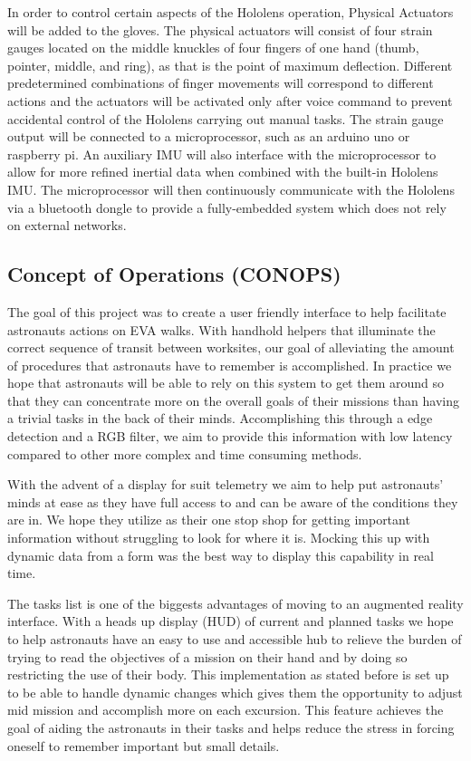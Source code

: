 \documentclass{article}
\let\Oldsubsection\subsection
\renewcommand{\subsection}{\FloatBarrier\Oldsubsection}
\begin{document}
In order to control certain aspects of the Hololens operation, Physical Actuators will be added to the gloves. The physical actuators will consist of four strain gauges located on the middle knuckles of four fingers of one hand (thumb, pointer, middle, and ring), as that is the point of maximum deflection. Different predetermined combinations of finger movements will correspond to different actions and the actuators will be activated only after voice command to prevent accidental control of the Hololens carrying out manual tasks. The strain gauge output will be connected to a microprocessor, such as an arduino uno or raspberry pi. An auxiliary IMU will also interface with the microprocessor to allow for more refined inertial data when combined with the built-in Hololens IMU. The microprocessor will then continuously communicate with the Hololens via a bluetooth dongle to provide a fully-embedded system which does not rely on external networks.

\subsection{Concept of Operations (CONOPS)}

The goal of this project was to create a user friendly interface to help facilitate astronauts actions on EVA walks. With handhold helpers that illuminate the correct sequence of transit between worksites, our goal of alleviating the amount of procedures that astronauts have to remember is accomplished. In practice we hope that astronauts will be able to rely on this system to get them around so that they can concentrate more on the overall goals of their missions than having a trivial tasks in the back of their minds. Accomplishing this through a edge detection and a RGB filter, we aim to provide this information with low latency compared to other more complex and time consuming methods.

With the advent of a display for suit telemetry we aim to help put astronauts’ minds at ease as they have full access to and can be aware of the conditions they are in. We hope they utilize as their one stop shop for getting important information without struggling to look for where it is. Mocking this up with dynamic data from a form was the best way to display this capability in real time.

The tasks list is one of the biggests advantages of moving to an augmented reality interface. With a heads up display (HUD) of current and planned tasks we hope to help astronauts have an easy to use and accessible hub to relieve the burden of trying to read the objectives of a mission on their hand and by doing so restricting the use of their body. This implementation as stated before is set up to be able to handle dynamic changes which gives them the opportunity to adjust mid mission and accomplish more on each excursion. This feature achieves the goal of aiding the astronauts in their tasks and helps reduce the stress in forcing oneself to remember important but small details.
\end{document}
